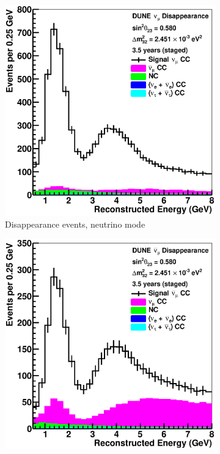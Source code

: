 \begin{figure}[h]
  \centering
  \begin{subfigure}[t]{.49\textwidth}
    \includegraphics[width=\linewidth]{files/figures/dune_detector/spec_dis_nu_no}
    \caption{Disappearance events, neutrino mode}
  \end{subfigure}
  \hfill
  \begin{subfigure}[t]{.49\textwidth}
    \includegraphics[width=\linewidth]{files/figures/dune_detector/spec_dis_anu_no}

\end{subfigure}
\end{figure}
